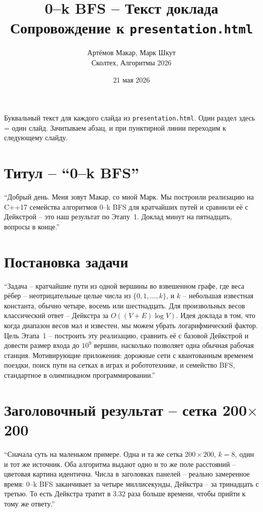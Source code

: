 \documentclass[11pt,a4paper]{article}
\title{\vspace{-2em}\textbf{0--k BFS -- Текст доклада}\\
\large Сопровождение к \texttt{presentation.html}}
\author{Артёмов Макар, Марк Шкут \\ Сколтех, Алгоритмы 2026}
\date{21 мая 2026}
\begin{document}
\maketitle
\vspace{-1em}

Буквальный текст для каждого слайда из \texttt{presentation.html}. Один
раздел здесь = один слайд. Зачитываем абзац, и при пунктирной линии
переходим к следующему слайду.

\section{Титул -- ``0--k BFS''}
``Добрый день. Меня зовут Макар, со мной Марк. Мы построили
реализацию на C++17 семейства алгоритмов 0--k BFS для кратчайших
путей и сравнили её с Дейкстрой -- это наш результат по Этапу~1.
Доклад минут на пятнадцать, вопросы в конце.''
\hrulefill

\section{Постановка задачи}
``Задача -- кратчайшие пути из одной вершины во взвешенном графе, где
веса рёбер -- неотрицательные целые числа из $\{0,1,\dots,k\}$, и $k$
-- небольшая известная константа, обычно четыре, восемь или
шестнадцать. Для произвольных весов классический ответ --
Дейкстра за $O((V+E)\log V)$. Идея доклада в том, что когда диапазон
весов мал и известен, мы можем убрать логарифмический фактор. Цель
Этапа~1 -- построить эту реализацию, сравнить её с базовой Дейкстрой
и довести размер входа до $10^9$ вершин, насколько позволяет одна
обычная рабочая станция. Мотивирующие приложения: дорожные сети с
квантованным временем поездки, поиск пути на сетках в играх и
робототехнике, и семейство BFS, стандартное в олимпиадном
программировании.''
\hrulefill

\section{Заголовочный результат -- сетка 200$\times$200}
``Сначала суть на маленьком примере. Одна и та же сетка $200{\times}200$,
$k=8$, один и тот же источник. Оба алгоритма выдают одно и то же поле
расстояний -- цветовая картина идентична. Числа в заголовках панелей --
реально замеренное время: 0--k BFS заканчивает за четыре миллисекунды,
Дейкстра -- за тринадцать с третью. То есть Дейкстра тратит в 3.32 раза
больше времени, чтобы прийти к тому же ответу.''
\hrulefill
\end{document}
